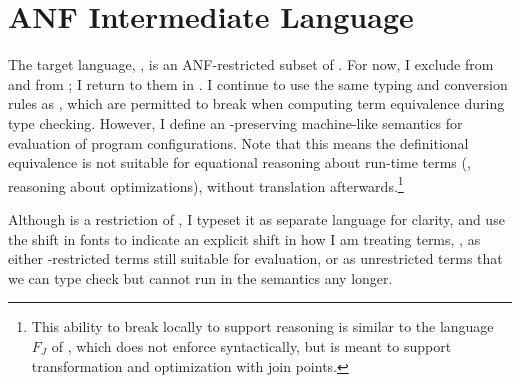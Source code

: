 \newcommand{\FigStackExports}[1][t]{
  \begin{figure}[#1]
    \judgshape{\tedefs{\tM} = \tlenv}
    \begin{displaymath}
      \tedefs{\tM} = \txone=\tNone,\dots,\txin{n}=\tNin{n} \hspace{-1em}\qquad \where{\tM = \tlete{\txone}{\tNone}{\dots\tlete{\txin{n}}{\tNin{n}}{\tNin{n+1}}}}
    \end{displaymath}
    \judgshape{\tehole{\tM} = \tN}
    \begin{displaymath}
      \tehole{\tM} = \tNin{n+1} \qquad \where{\tM = \tlete{\txone}{\tNone}{\dots\tlete{\txin{n}}{\tNin{n}}{\tNin{n+1}}}}
    \end{displaymath}
    \caption{\tlang Continuation Exports}
    \label{fig:anf:ecca:exports}
  \end{figure}
}

\section{{{ANF}} Intermediate Language}
\label{sec:anf:target}

\FigECCASyntax
The target language, \tlang, is an ANF-restricted subset of \slang.
For now, I exclude  from \slang and from \tlang; I
return to them in .
I continue to use the same typing and conversion rules as \slang, which are
permitted to break  when computing term equivalence during type
checking.
However, I define an -preserving machine-like semantics for
evaluation of program configurations.
Note that this means the definitional equivalence is not suitable for equational
reasoning about run-time terms (\eg, reasoning about optimizations), without
 translation afterwards.\footnote{This ability to break 
  locally to support reasoning is similar to the language \(F_J\) of
  \citet{maurer2017}, which does not enforce  syntactically, but is
  meant to support  transformation and optimization with join points.}

\begin{typographical}
Although \tlang is a restriction of \slang, I typeset it as separate language for
clarity, and use the shift in fonts to indicate an explicit shift in how I am
treating terms, \ie, as either -restricted terms still suitable for
evaluation, or as unrestricted terms that we can type check but cannot run in
the  semantics any longer.
\end{typographical}

